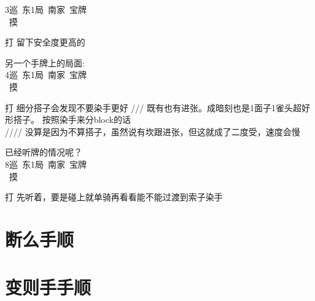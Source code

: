 \documentclass[小V的日麻笔记.tex]{subfiles}
\begin{document}
3巡\ 东1局\ 南家\ 宝牌\\
\ 摸 \\
\begin{itemize}
\arrowitem 打
\arrowitem {}留下安全度更高的
\end{itemize}

另一个手牌上的局面:\\
4巡\ 东1局\ 南家\ 宝牌\\
\ 摸 \\
\begin{itemize}
\arrowitem 打
\arrowitem 细分搭子会发现不要染手更好
\arrowitem {}///
\arrowitem {}既有也有进张。成暗刻也是1面子1雀头超好形搭子。
\arrowitem 按照染手来分block的话 \\
////
\arrowitem 没算是因为不算搭子，虽然说有坎跟进张，但这就成了二度受，速度会慢
\end{itemize}

已经听牌的情况呢？\\
8巡\ 东1局\ 南家\ 宝牌\\
\  摸 \\
\begin{itemize}
\arrowitem 打
\arrowitem 先听着，要是碰上就单骑再看看能不能过渡到索子染手
\end{itemize}
\section{断么手顺}
\section{变则手手顺}
\end{document}
